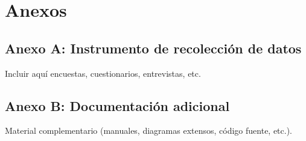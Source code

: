 \appendix
\chapter{Anexos}
\label{cap:anexos}

\section*{Anexo A: Instrumento de recolección de datos}
Incluir aquí encuestas, cuestionarios, entrevistas, etc.

\section*{Anexo B: Documentación adicional}
Material complementario (manuales, diagramas extensos, código fuente, etc.).
